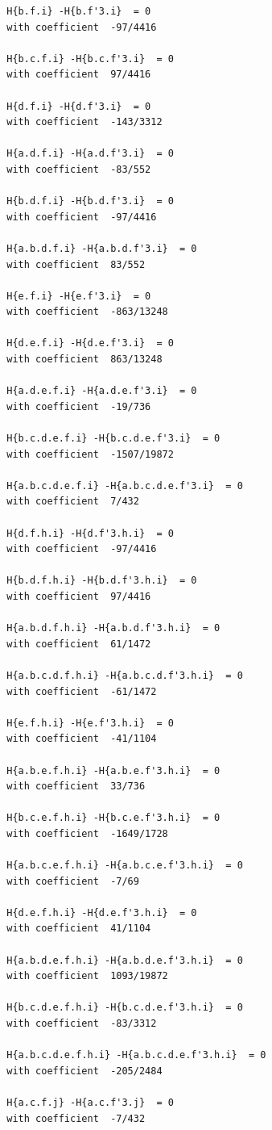 \documentclass[11pt, a4paper]{kybernetika}
\begin{document}
\begin{verbatim}
		H{b.f.i} -H{b.f'3.i}  = 0
		with coefficient  -97/4416
		
		H{b.c.f.i} -H{b.c.f'3.i}  = 0
		with coefficient  97/4416
		
		H{d.f.i} -H{d.f'3.i}  = 0
		with coefficient  -143/3312
		
		H{a.d.f.i} -H{a.d.f'3.i}  = 0
		with coefficient  -83/552
		
		H{b.d.f.i} -H{b.d.f'3.i}  = 0
		with coefficient  -97/4416
		
		H{a.b.d.f.i} -H{a.b.d.f'3.i}  = 0
		with coefficient  83/552
		
		H{e.f.i} -H{e.f'3.i}  = 0
		with coefficient  -863/13248
		
		H{d.e.f.i} -H{d.e.f'3.i}  = 0
		with coefficient  863/13248
		
		H{a.d.e.f.i} -H{a.d.e.f'3.i}  = 0
		with coefficient  -19/736
		
		H{b.c.d.e.f.i} -H{b.c.d.e.f'3.i}  = 0
		with coefficient  -1507/19872
		
		H{a.b.c.d.e.f.i} -H{a.b.c.d.e.f'3.i}  = 0
		with coefficient  7/432
		
		H{d.f.h.i} -H{d.f'3.h.i}  = 0
		with coefficient  -97/4416
		
		H{b.d.f.h.i} -H{b.d.f'3.h.i}  = 0
		with coefficient  97/4416
		
		H{a.b.d.f.h.i} -H{a.b.d.f'3.h.i}  = 0
		with coefficient  61/1472
		
		H{a.b.c.d.f.h.i} -H{a.b.c.d.f'3.h.i}  = 0
		with coefficient  -61/1472
		
		H{e.f.h.i} -H{e.f'3.h.i}  = 0
		with coefficient  -41/1104
		
		H{a.b.e.f.h.i} -H{a.b.e.f'3.h.i}  = 0
		with coefficient  33/736
		
		H{b.c.e.f.h.i} -H{b.c.e.f'3.h.i}  = 0
		with coefficient  -1649/1728
		
		H{a.b.c.e.f.h.i} -H{a.b.c.e.f'3.h.i}  = 0
		with coefficient  -7/69
		
		H{d.e.f.h.i} -H{d.e.f'3.h.i}  = 0
		with coefficient  41/1104
		
		H{a.b.d.e.f.h.i} -H{a.b.d.e.f'3.h.i}  = 0
		with coefficient  1093/19872
		
		H{b.c.d.e.f.h.i} -H{b.c.d.e.f'3.h.i}  = 0
		with coefficient  -83/3312
		
		H{a.b.c.d.e.f.h.i} -H{a.b.c.d.e.f'3.h.i}  = 0
		with coefficient  -205/2484
		
		H{a.c.f.j} -H{a.c.f'3.j}  = 0
		with coefficient  -7/432
		

\end{verbatim}
\end{document}
